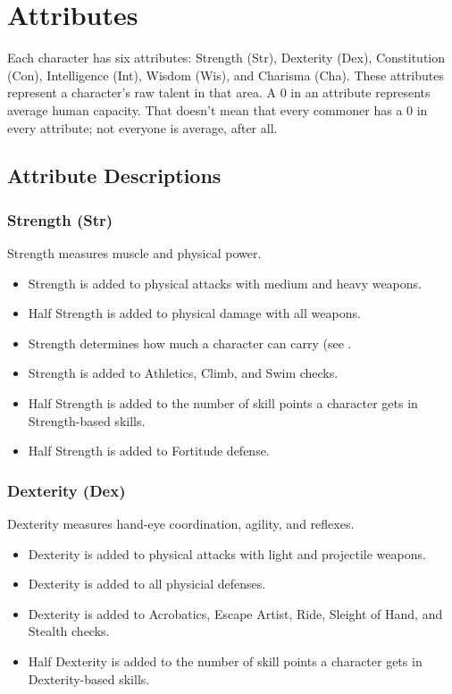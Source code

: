 \chapter{Attributes}
Each character has six attributes: Strength (Str), Dexterity (Dex), Constitution (Con), Intelligence (Int), Wisdom (Wis), and Charisma (Cha). These attributes represent a character's raw talent in that area. A 0 in an attribute represents average human capacity. That doesn't mean that every commoner has a 0 in every attribute; not everyone is average, after all.

\section{Attribute Descriptions}

\subsection{Strength (Str)}
Strength measures muscle and physical power.
\begin{itemize}
    \item Strength is added to physical attacks with medium and heavy weapons.
    \item Half Strength is added to physical damage with all weapons.
    \item Strength determines how much a character can carry (see .
    \item Strength is added to Athletics, Climb, and Swim checks.
    \item Half Strength is added to the number of skill points a character gets in Strength-based skills.
    \item Half Strength is added to Fortitude defense.
\end{itemize}

\subsection{Dexterity (Dex)}
Dexterity measures hand-eye coordination, agility, and reflexes.
\begin{itemize}
    \item Dexterity is added to physical attacks with light and projectile weapons.
    \item Dexterity is added to all physicial defenses.
    \item Dexterity is added to Acrobatics, Escape Artist, Ride, Sleight of Hand, and Stealth checks.
    \item Half Dexterity is added to the number of skill points a character gets in Dexterity-based skills.
\end{itemize}

